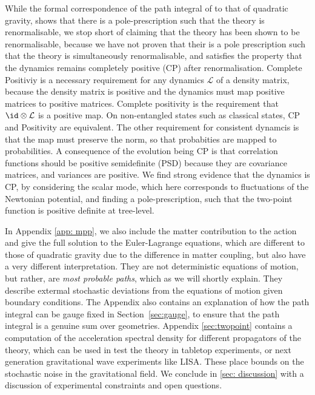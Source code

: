 \documentclass[aps,preprintnumbers,superscriptaddress,longbibliography]{revtex4-1}
\begin{document}
While the formal correspondence of the path integral of \cite{oppenheim2023covariant} to that of quadratic gravity, shows that there is a pole-prescription such that the theory is renormalisable, we stop short of claiming that the theory has been shown to be renormalisable, because we have not proven that their is a pole prescription such that the theory is simultaneously renormalisable, and satisfies the property that the dynamics remains completely positive (CP) after renormalisation. Complete Positiviy is a necessary requirement for any dynamics $\mathcal{L}$ of a density matrix, because the density matrix is positive and the dynamics must map positive matrices to positive matrices. Complete positivity is the requirement that $\id\otimes\mathcal{L}$ is a positive map. On non-entangled states such as classical states, CP and Positivity are equivalent.  The other requirement for consistent dynamcis is that the map must preserve the norm, so that probabities are mapped to probabilities. A consequence of the evolution being CP is that correlation functions should be positive semidefinite (PSD) because they are covariance matrices, and variances are positive.  We find strong evidence that the dynamics is CP, by considering the scalar mode, which here corresponds to fluctuations of the Newtonian potential, and finding a pole-prescription, such that the two-point function is positive definite at tree-level. %

In  Appendix \ref{app: mpp}, we also include the matter contribution to the action and give the full solution to the Euler-Lagrange equations, which are different to those of quadratic gravity due to the difference in matter coupling, but also have a very different interpretation. They are not deterministic equations of motion, but rather, are {\it most probable paths}, which as we will shortly explain. They describe extermal stochastic deviations from the equations of motion given boundary conditions. The Appendix also contains an explanation of how the path integral can be gauge fixed in Section~\ref{sec:gauge}, to ensure that the path integral is a genuine sum over geometries. Appendix \ref{sec:twopoint} contains a computation of the acceleration spectral density for different propagators of the theory, which can be used in test the theory in tabletop experiments, or next generation gravitational wave experiments like LISA. These place bounds on the stochastic noise in the gravitational field. %
We conclude in \ref{sec: discussion} with a discussion of experimental constraints and open questions. 
\end{document}
